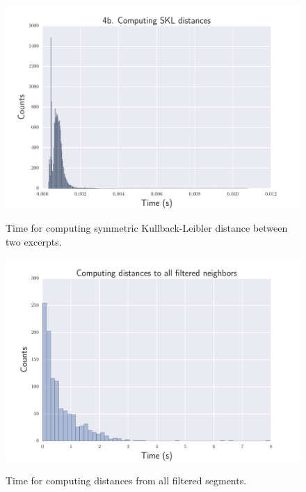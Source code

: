 \begin{figure}[htbp]
\begin{center}
\includegraphics[scale=0.7]{Figures/bench_skl.pdf}
  \caption[Time for computing symmetric Kullback-Leibler distance]{Time for computing symmetric Kullback-Leibler distance between two excerpts.}
  \label{fig:step5}
\vspace{2cm}
\includegraphics[scale=0.7]{Figures/bench_get_suitsegm.pdf}
  \caption[Time for computing distances from all filtered segments]{Time for computing distances from all filtered segments.}
  \label{fig:step6}
\end{center}
\end{figure}

